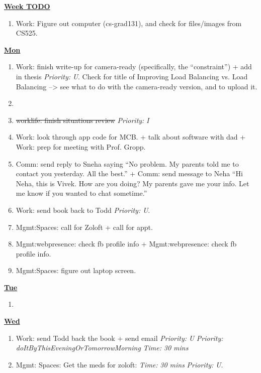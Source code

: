 \documentclass[serif,mathserif,final]{beamer}
\newcommand{\doneTask}[1]{\item \sout{#1}}
\newcommand{\timeEst}[1]{\textit{Time:} \textit{#1}}
\newcommand{\priority}[1]{\textit{Priority:} \textit{#1}}
\begin{document}
\begin{frame}{}
\begin{columns}[t]
\begin{column}{0.33\linewidth}{\textbf{\underline{Week TODO}}}
\begin{block}
\begin{enumerate}
\item \tiny Work: Figure out computer (cs-grad131), and check for
  files/images from CS525. 

\end{enumerate}
\end{block} 

\begin{block} 

\textbf{\underline{Mon}}
\begin{enumerate} 
\tiny \item \tiny Work: finish write-up for camera-ready (specifically,
the ``constraint'') + add in thesis \priority{U}. Check for title of 
Improving Load Balancing vs. Load Balancing --> see what to do with 
the camera-ready version, and to upload it. 

\item \tiny \doneTask{worklife: finish situations review}
  \priority{I} 

\item \tiny Work: look through app code for MCB. + talk about software
  with dad + Work: prep for meeting with Prof. Gropp. 

\item \tiny Comm: send reply to Sneha saying 
``No problem. My parents told me to contact you yesterday. All the best.''  
+ Comm: send message to Neha  ``Hi Neha, this is Vivek. How are you
doing? My parents gave me your info. Let me know if you wanted to chat
sometime.'' 

\item \tiny Work: send book back to Todd \priority{U}. 
\item \tiny Mgmt:Spaces: call for Zoloft + call for appt. 
\item \tiny Mgmt:webpresence: check fb profile info +  Mgmt:webpresence: check fb profile info. 
\item \tiny Mgmt:Spaces: figure out laptop screen. 
\end{enumerate} 

\textbf{\underline{Tue}}
\begin{enumerate} 
\tiny \item \tiny 

\end{enumerate} 

\textbf{\underline{Wed}}
\begin{enumerate} 
\item \tiny Work: send Todd back the book + send email \priority{U}
  \priority{doItByThisEveningOrTomorrowMorning} \timeEst{30 mins} 
\item \tiny Mgmt: Spaces: Get the meds for zoloft: \timeEst{30 mins}
  \priority{U}. 


\end{enumerate}
\end{block}
\end{column}
\end{columns}
\end{frame}
\end{document}
